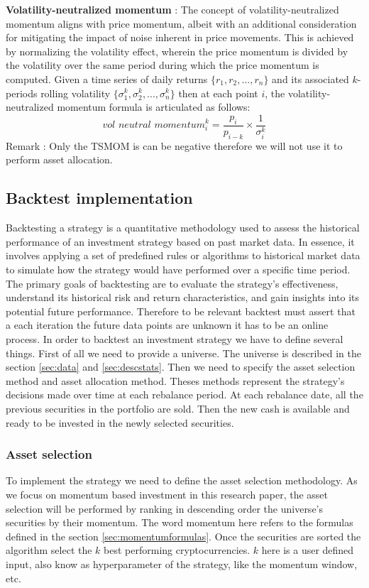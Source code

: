 \documentclass{article}
\begin{document}
\textbf{Volatility-neutralized momentum} : The concept of volatility-neutralized momentum aligns with price momentum, albeit with an additional consideration for mitigating the impact of noise inherent in price movements. This is achieved by normalizing the volatility effect, wherein the price momentum is divided by the volatility over the same period during which the price momentum is computed. Given a time series of daily returns $\{r_1, r_2, ..., r_n\}$ and its associated $k$-periods rolling volatility $\{\sigma_1^k, \sigma_2^k, ..., \sigma_n^k\}$ then at each point $i$, the volatility-neutralized momentum formula is articulated as follows: $$\textit{vol neutral momentum}^{k}_i = \frac{p_i}{p_{i-k}}\times\frac{1}{\sigma_i^k}$$
Remark : Only the TSMOM is can be negative therefore we will not use it to perform asset allocation.
\subsection{Backtest implementation}
Backtesting a strategy is a quantitative methodology used to assess the historical performance of an investment strategy based on past market data. In essence, it involves applying a set of predefined rules or algorithms to historical market data to simulate how the strategy would have performed over a specific time period. The primary goals of backtesting are to evaluate the strategy's effectiveness, understand its historical risk and return characteristics, and gain insights into its potential future performance. Therefore to be relevant backtest must assert that a each iteration the future data points are unknown it has to be an online process.
\newline
In order to backtest an investment strategy we have to define several things. First of all we need to provide a universe. The universe is described in the section \ref{sec:data} and \ref{sec:descstats}. Then we need to specify the asset selection method and asset allocation method. Theses methods represent the strategy's decisions made over time at each rebalance period. At each rebalance date, all the previous securities in the portfolio are sold. Then the new cash is available and ready to be invested in the newly selected securities.

\subsubsection{Asset selection}
To implement the strategy we need to define the asset selection methodology. As we focus on momentum based investment in this research paper, the asset selection will be performed by ranking in descending order the universe's securities by their momentum. The word momentum here refers to the formulas defined in the section \ref{sec:momentumformulas}. Once the securities are sorted the algorithm select the $k$ best performing cryptocurrencies. $k$ here is a user defined input, also know as hyperparameter of the strategy, like the momentum window, etc.
\end{document}
